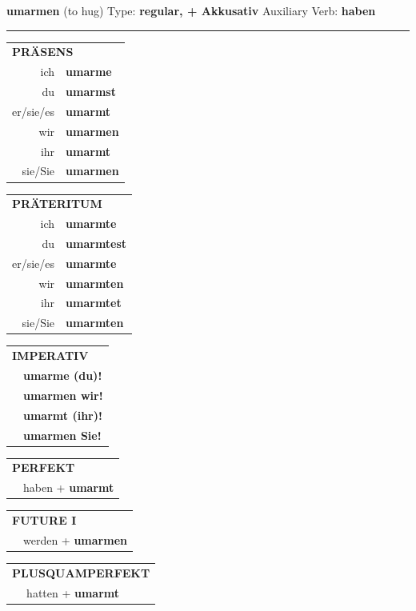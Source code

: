 \documentclass[10pt,a4paper]{revtex4-2}
\begin{document}
\begin{verbbox-acc}
{\Large \bf umarmen} (to hug) \hfill Type: \textbf{regular, + Akkusativ} \hfill Auxiliary Verb: \textbf{haben}

\vspace{5pt}
\hrule
\vspace{5pt}

\begin{tabular}{rl}
\multicolumn{2}{l}{\textbf{PRÄSENS}}\\
ich & \textbf{umarme}\\
du & \textbf{umarmst}\\
er/sie/es & \textbf{umarmt}\\
wir & \textbf{umarmen}\\
ihr & \textbf{umarmt}\\
sie/Sie & \textbf{umarmen}\\
\end{tabular}
\hfill
\begin{tabular}{rl}
\multicolumn{2}{l}{\textbf{PRÄTERITUM}}\\
ich & \textbf{umarmte}\\
du & \textbf{umarmtest}\\
er/sie/es & \textbf{umarmte}\\
wir & \textbf{umarmten}\\
ihr & \textbf{umarmtet}\\
sie/Sie & \textbf{umarmten}\\
\end{tabular}
\hfill
\begin{tabular}{rl}
\multicolumn{2}{l}{\textbf{IMPERATIV}}\\
& \textbf{umarme (du)!}\\
& \textbf{umarmen wir!}\\
& \textbf{umarmt (ihr)!}\\
& \textbf{umarmen Sie!}\\
\end{tabular}

\vspace{10pt}

\begin{tabular}{rl}
\multicolumn{2}{l}{\textbf{PERFEKT}}\\
& haben + \textbf{umarmt}\\
\end{tabular}
\hfill
\begin{tabular}{rl}
\multicolumn{2}{l}{\textbf{FUTURE I}}\\
& werden + \textbf{umarmen}\\
\end{tabular}
\hfill
\begin{tabular}{rl}
\multicolumn{2}{l}{\textbf{PLUSQUAMPERFEKT}}\\
& hatten + \textbf{umarmt}\\
\end{tabular}


\end{verbbox-acc}
\end{document}
